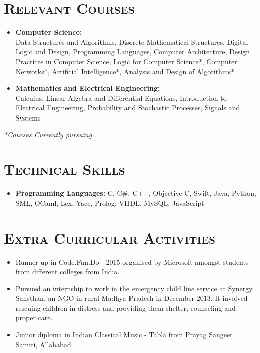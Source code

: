 \documentclass{article}
\newenvironment{longversion}{}{} %
\newcommand{\tmpsection}[1]{}
\let\tmpsection=\section
\renewcommand{\section}[1]{\tmpsection*{\textsc{#1}}}
\begin{document}
\begin{longversion}
\section{Relevant Courses}
\begin{itemize}
\setlength\itemsep{-1em}
\item \textbf{Computer Science:} \\
Data Structures and Algorithms, Discrete Mathematical Structures, Digital Logic and Design, Programming Languages, Computer Architecture, Design Practices in Computer Science, Logic for Computer Science*, Computer Networks*, Artificial Intelligence*, Analysis and Design of Algorithms*  \\

\item \textbf{Mathematics and Electrical Engineering:} \\
Calculus, Linear Algebra and Differential Equations, Introduction to Electrical Engineering,  Probability and Stochastic Processes, Signals and Systems
\end{itemize}
\textit{*Courses Currently pursuing}
\end{longversion}


\begin{longversion}
\section{Technical Skills}
\begin{itemize}
\item \textbf{Programming Languages:} C, C\#, C++, Objective-C, Swift, Java, Python, SML, OCaml, Lex, Yacc, Prolog, VHDL, MySQL, JavaScript 

\end{itemize}
\end{longversion}

\section{Extra Curricular Activities}

\begin{itemize}
    \setlength\itemsep{0em}
    \item Runner up in Code.Fun.Do - 2015 organised by Microsoft amongst students from different colleges from India.
    \item Pursued an internship to work in the emergency child line service at Synergy Sansthan, an NGO in rural Madhya Pradesh in December 2013. It involved rescuing children in distress and providing them shelter, counseling and proper care.
    \item Junior diploma in Indian Classical Music - Tabla from Prayag Sangeet Samiti, Allahabad. 
\end{itemize}
\end{document}
